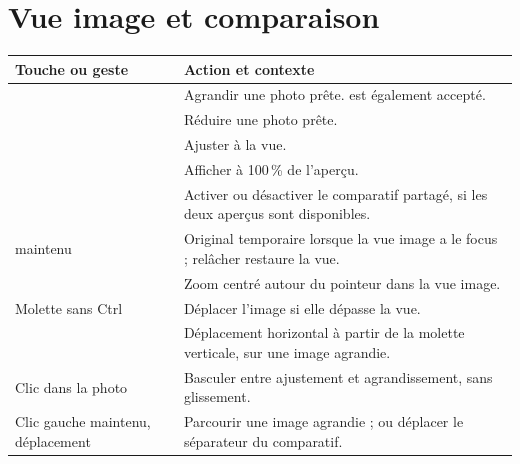 \clearpage
\section*{Vue image et comparaison}

\begin{longtable}{@{}L{4.4cm}L{9.2cm}@{}}
\toprule Touche ou geste & Action et contexte\\\midrule\endhead
{} & Agrandir une photo prête.  est également accepté.\\
 & Réduire une photo prête.\\
 & Ajuster à la vue.\\
 & Afficher à 100\,\% de l’aperçu.\\
 & Activer ou désactiver le comparatif partagé, si les deux aperçus sont disponibles.\\
 maintenu & Original temporaire lorsque la vue image a le focus ; relâcher restaure la vue.\\
 & Zoom centré autour du pointeur dans la vue image.\\
Molette sans Ctrl & Déplacer l’image si elle dépasse la vue.\\
 & Déplacement horizontal à partir de la molette verticale, sur une image agrandie.\\
Clic dans la photo & Basculer entre ajustement et agrandissement, sans glissement.\\
Clic gauche maintenu, déplacement & Parcourir une image agrandie ; ou déplacer le séparateur du comparatif.\\
\bottomrule
\end{longtable}

\clearpage
